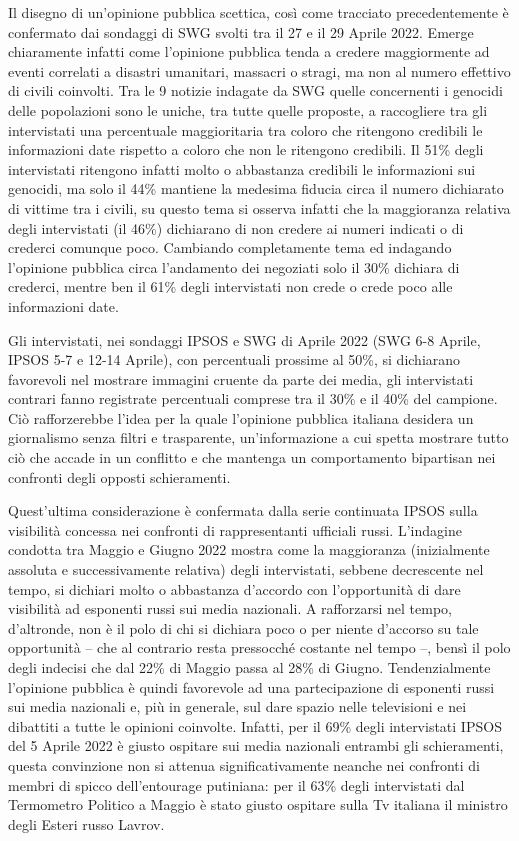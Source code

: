 \documentclass[
]{book}
\begin{document}
Il disegno di un'opinione pubblica scettica, così come tracciato precedentemente è confermato dai sondaggi di SWG svolti tra il 27 e il 29 Aprile 2022. Emerge chiaramente infatti come l'opinione pubblica tenda a credere maggiormente ad eventi correlati a disastri umanitari, massacri o stragi, ma non al numero effettivo di civili coinvolti. Tra le 9 notizie indagate da SWG quelle concernenti i genocidi delle popolazioni sono le uniche, tra tutte quelle proposte, a raccogliere tra gli intervistati una percentuale maggioritaria tra coloro che ritengono credibili le informazioni date rispetto a coloro che non le ritengono credibili. Il 51\% degli intervistati ritengono infatti molto o abbastanza credibili le informazioni sui genocidi, ma solo il 44\% mantiene la medesima fiducia circa il numero dichiarato di vittime tra i civili, su questo tema si osserva infatti che la maggioranza relativa degli intervistati (il 46\%) dichiarano di non credere ai numeri indicati o di crederci comunque poco. Cambiando completamente tema ed indagando l'opinione pubblica circa l'andamento dei negoziati solo il 30\% dichiara di crederci, mentre ben il 61\% degli intervistati non crede o crede poco alle informazioni date.

Gli intervistati, nei sondaggi IPSOS e SWG di Aprile 2022 (SWG 6-8 Aprile, IPSOS 5-7 e 12-14 Aprile), con percentuali prossime al 50\%, si dichiarano favorevoli nel mostrare immagini cruente da parte dei media, gli intervistati contrari fanno registrate percentuali comprese tra il 30\% e il 40\% del campione. Ciò rafforzerebbe l'idea per la quale l'opinione pubblica italiana desidera un giornalismo senza filtri e trasparente, un'informazione a cui spetta mostrare tutto ciò che accade in un conflitto e che mantenga un comportamento bipartisan nei confronti degli opposti schieramenti.

Quest'ultima considerazione è confermata dalla serie continuata IPSOS sulla visibilità concessa nei confronti di rappresentanti ufficiali russi. L'indagine condotta tra Maggio e Giugno 2022 mostra come la maggioranza (inizialmente assoluta e successivamente relativa) degli intervistati, sebbene decrescente nel tempo, si dichiari molto o abbastanza d'accordo con l'opportunità di dare visibilità ad esponenti russi sui media nazionali. A rafforzarsi nel tempo, d'altronde, non è il polo di chi si dichiara poco o per niente d'accorso su tale opportunità -- che al contrario resta pressocché costante nel tempo --, bensì il polo degli indecisi che dal 22\% di Maggio passa al 28\% di Giugno.
Tendenzialmente l'opinione pubblica è quindi favorevole ad una partecipazione di esponenti russi sui media nazionali e, più in generale, sul dare spazio nelle televisioni e nei dibattiti a tutte le opinioni coinvolte. Infatti, per il 69\% degli intervistati IPSOS del 5 Aprile 2022 è giusto ospitare sui media nazionali entrambi gli schieramenti, questa convinzione non si attenua significativamente neanche nei confronti di membri di spicco dell'entourage putiniana: per il 63\% degli intervistati dal Termometro Politico a Maggio è stato giusto ospitare sulla Tv italiana il ministro degli Esteri russo Lavrov.
\end{document}
